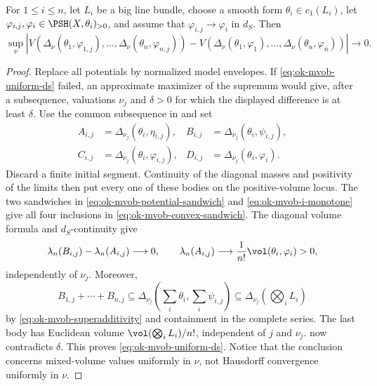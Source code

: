 \begin{proposition}\label{prop:ok-mvob-uniform-ds}
For \(1\leq i\leq n\), let \(L_i\) be a big line bundle, choose a smooth
form \(\theta_i\in c_1(L_i)\), let
\(\varphi_{i,j},\varphi_i\in\PSH(X,\theta_i)_{>0}\), and assume that
\(\varphi_{i,j}\to\varphi_i\) in \(d_S\).
Then
\[
 \sup_\nu\left|
 V(\Delta_\nu(\theta_1,\varphi_{1,j}),\ldots,
   \Delta_\nu(\theta_n,\varphi_{n,j}))
 -V(\Delta_\nu(\theta_1,\varphi_1),\ldots,
   \Delta_\nu(\theta_n,\varphi_n))\right|\longrightarrow0.
\tag{55.39}\label{eq:ok-mvob-uniform-ds}
\]
\end{proposition}

\begin{proof}
Replace all potentials by normalized model envelopes.  If
\eqref{eq:ok-mvob-uniform-ds} failed, an approximate maximizer of the
supremum would give, after a subsequence, valuations \(\nu_j\) and
\(\delta>0\) for which the displayed difference is at least \(\delta\).
Use the common subsequence in  and set
\[
 \begin{aligned}
 A_{i,j}&=\Delta_{\nu_j}(\theta_i,\eta_{i,j}),&
 B_{i,j}&=\Delta_{\nu_j}(\theta_i,\psi_{i,j}),\\
 C_{i,j}&=\Delta_{\nu_j}(\theta_i,\varphi_{i,j}),&
 D_{i,j}&=\Delta_{\nu_j}(\theta_i,\varphi_i).
 \end{aligned}
\]
Discard a finite initial segment.  Continuity of the diagonal masses and
positivity of the limits then put every one of these bodies on the
positive-volume locus.  The two sandwiches in
\eqref{eq:ok-mvob-potential-sandwich} and
\eqref{eq:ok-mvob-i-monotone} give all four inclusions in
\eqref{eq:ok-mvob-convex-sandwich}.  The diagonal volume formula and
\(d_S\)-continuity give
\[
 \lambda_n(B_{i,j})-\lambda_n(A_{i,j})\longrightarrow0,\qquad
 \lambda_n(A_{i,j})\longrightarrow
 \frac1{n!}\vol(\theta_i,\varphi_i)>0,
\]
independently of \(\nu_j\).  Moreover,
\[
 B_{1,j}+\cdots+B_{n,j}
 \subseteq\Delta_{\nu_j}\!\left(\sum_i\theta_i,
                                  \sum_i\psi_{i,j}\right)
 \subseteq\Delta_{\nu_j}\!\left(\bigotimes_iL_i\right)
\]
by \eqref{eq:ok-mvob-superadditivity} and containment in the complete
series.  The last body has Euclidean volume
\(\vol(\bigotimes_iL_i)/n!\), independent of \(j\) and \(\nu_j\).
 now contradicts \(\delta\).  This
proves \eqref{eq:ok-mvob-uniform-ds}.  Notice that the conclusion concerns
mixed-volume values uniformly in \(\nu\), not Hausdorff convergence
uniformly in \(\nu\).
\end{proof}

